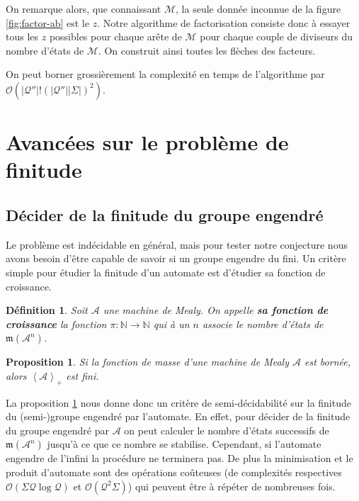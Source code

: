 \documentclass[11pt,a4paper]{article}
\newtheorem{prop}{Proposition}
\newtheorem{definition}{Définition}
\begin{document}
On remarque alors, que connaissant $\mathcal{M}$, la seule donnée inconnue de la figure \ref{fig:factor-ab} est le $z$. Notre algorithme de factorisation consiste donc à essayer tous les $z$ possibles pour chaque arête de $\mathcal{M}$ pour chaque couple de diviseurs du nombre d'états de $\mathcal{M}$. On construit ainsi toutes les flèches des facteurs.

On peut borner grossièrement la complexité en temps de l'algorithme par $\mathcal{O}(|\mathcal{Q''}|!\left(|\mathcal{Q''}||\Sigma|\right)^2)$.

\section{Avancées sur le problème de finitude\label{sec:finitude}}

\subsection{Décider de la finitude du groupe engendré}

Le problème est indécidable en général, mais pour tester notre conjecture nous avons besoin d'être capable de savoir si un groupe engendre du fini. Un critère simple pour étudier la finitude d'un automate est d'étudier sa fonction de croissance.

\begin{definition}
  Soit $\mathcal{A}$ une machine de Mealy. On appelle \textbf{\textit{sa fonction de croissance}} la fonction $\pi:\mathbb{N}\rightarrow\mathbb{N}$ qui à un $n$ associe le nombre d'états de $\mathfrak{m}\left(\mathcal{A}^n\right)$.
\end{definition}

\begin{prop}
  \label{prop:mass}
  Si la fonction de masse d'une machine de Mealy $\mathcal{A}$ est bornée, alors $\left<\mathcal{A}\right>_+$ est fini.
\end{prop}

La proposition \ref{prop:mass} nous donne donc un critère de semi-décidabilité sur la finitude du (semi-)groupe engendré par l'automate. En effet, pour décider de la finitude du groupe engendré par $\mathcal{A}$ on peut calculer le nombre d'états successifs de $\mathfrak{m}\left(\mathcal{A}^n\right)$ jusqu'à ce que ce nombre se stabilise. Cependant, si l'automate engendre de l'infini la procédure ne terminera pas. De plus la minimisation et le produit d'automate sont des opérations coûteuses (de complexités respectives $\mathcal{O}\left(\Sigma\mathcal{Q}\log\mathcal{Q}\right)$ et $\mathcal{O}\left(\mathcal{Q}^2\Sigma\right)$) qui peuvent être à répéter de nombreuses fois.
\end{document}
